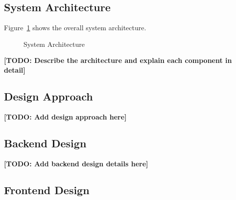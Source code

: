 
\subsection{System Architecture}


Figure~\ref{fig:system_architecture} shows the overall system architecture.

\begin{figure}[H]
  \centering
  \caption{System Architecture}
  \label{fig:system_architecture}
\end{figure}

\textbf{[TODO: Describe the architecture and explain each component in detail]}

\subsection{Design Approach}


\textbf{[TODO: Add design approach here]}

\subsection{Backend Design}


\textbf{[TODO: Add backend design details here]}

\subsection{Frontend Design}



